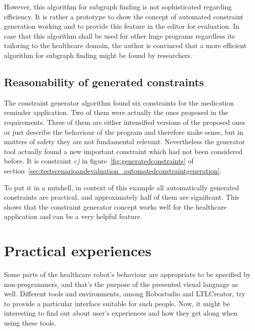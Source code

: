 However, this algorithm for subgraph finding is not sophisticated regarding efficiency. It is rather a prototype to show the concept of automated constraint generation working and to provide this feature in the editor for evaluation. In case that this algorithm shall be used for other huge programs regardless its tailoring to the healthcare domain, the author is convinced that a more efficient algorithm for subgraph finding might be found by researchers.






\subsection{Reasonability of generated constraints}

The constraint generator algorithm found six constraints for the medication reminder application. Two of them were actually the ones proposed in the requirements. Three of them are either intensified versions of the proposed ones or just describe the behaviour of the program and therefore make sense, but in matters of safety they are not fundamental relevant.
Nevertheless the generator tool actually found a new important constraint which had not been considered before. It is constraint \emph{c)} in figure~\ref{fig:generatedconstraints} of section~\ref{sec:testscenarioandevaluation_automatedconstraintgeneration}.

To put it in a nutshell, in context of this example all automatically generated constraints are practical, and approximately half of them are significant. This shows that the constraint generator concept works well for the healthcare application and can be a very helpful feature.




\section{Practical experiences}
\label{sec:practicalexperiences}

Some parts of the healthcare robot's behaviour are appropriate to be specified by non-programmers, and that's the purpose of the presented visual language as well. Different tools and environments, among Robostudio and LTLCreator, try to provide a particular interface suitable for such people. Now, it might be interesting to find out about user's experiences and how they get along when using these tools.

